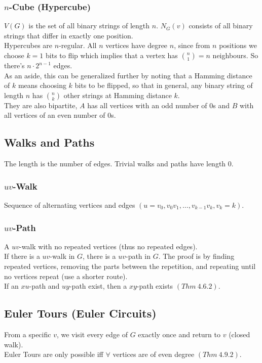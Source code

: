 \documentclass[11pt]{article}
\newcommand{\nl}{\\[5pt]}
\begin{document}
\subsubsection{$n$-Cube (Hypercube)}
$V(G)$ is the set of all binary strings of length $n$. $N_G(v)$ consists of all binary strings that differ in exactly one position.\nl
Hypercubes are $n$-regular. All $n$ vertices have degree $n$, since from $n$ positions we choose $k = 1$ bits to flip which implies that a vertex has $\binom{n}{1} = n$ neighbours. So there's $n \cdot 2^{n-1}$ edges. \nl 
As an aside, this can be generalized further by noting that a Hamming distance of $k$ means choosing $k$ bits to be flipped, so that in general, any binary string of length $n$ has $\binom{n}{k}$ other strings at Hamming distance $k$.\nl
They are also bipartite, $A$ has all vertices with an odd number of 0s and $B$ with all vertices of an even number of 0s. 

\subsection{Walks and Paths}
The length is the number of edges. Trivial walks and paths have length 0. 

\subsubsection{$uv$-Walk}
Sequence of alternating vertices and edges $(u = v_0, v_0v_1, \dots, v_{k-1}v_k, v_k = k)$.

\subsubsection{$uv$-Path}
A $uv$-walk with no repeated vertices (thus no repeated edges). \nl 
If there is a $uv$-walk in $G$, there is a $uv$-path in $G$. The proof is by finding repeated vertices, removing the parts between the repetition, and repeating until no vertices repeat (use a shorter route). \nl 
If an $xu$-path and $uy$-path exist, then a $xy$-path exists $(Thm \: 4.6.2)$.

\subsection{Euler Tours (Euler Circuits)}
From a specific $v$, we visit every edge of $G$ exactly once and return to $v$ (closed walk). \nl
Euler Tours are only possible iff $\forall$ vertices are of even degree $(Thm \: 4.9.2)$. 
\end{document}
